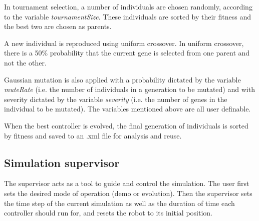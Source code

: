 In tournament selection, a number of individuals are chosen randomly, according to the variable \textit{tournamentSize}. These individuals are sorted by their fitness and the best two are chosen as parents. 

A new individual is reproduced using uniform crossover. In uniform crossover, there is a 50\% probability that the current gene is selected from one parent and not the other. 

Gaussian mutation is also applied with a probability dictated by the variable \textit{muteRate} (i.e. the number of individuals in a generation to be mutated) and with severity dictated by the variable \textit{severity} (i.e. the number of genes in the individual to be mutated). The variables mentioned above are all user definable.

When the best controller is evolved, the final generation of individuals is sorted by fitness and saved to an .xml file for analysis and reuse.

\subsection{Simulation supervisor}

The supervisor acts as a tool to guide and control the simulation. The user first sets the desired mode of operation (demo or evolution). Then the supervisor sets the time step of the current simulation as well as the duration of time each controller should run for, and resets the robot to its initial position.  

